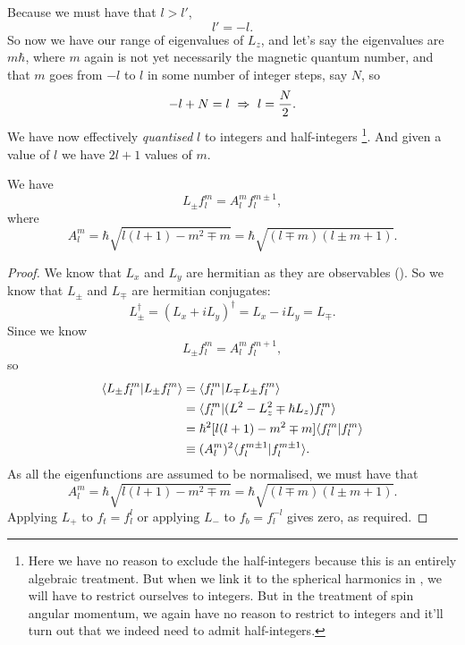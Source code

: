 Because we must have that $l>l'$, 
\begin{equation}
l'=-l.
\end{equation}
So now we have our range of eigenvalues of $L_z$, and let's say the eigenvalues are $m\hbar$, 
where $m$ again is not yet necessarily the magnetic quantum number, and that
$m$ goes from $-l$ to $l$ in some number of integer steps, say $N$, so
\begin{equation}
-l+N=l\ \Rightarrow\ l=\frac{N}{2}.
\end{equation}
We have now effectively \textit{quantised} $l$ to integers and half-integers
\footnote{Here we have no reason to exclude the half-integers because this is 
an entirely algebraic treatment. But when we link it to the spherical harmonics 
in , we will have to restrict ourselves to integers. 
But in the treatment of spin angular momentum, we again have no reason to 
restrict to integers and it'll turn out that we 
indeed need to admit half-integers.}. 
And given a value of $l$ we have $2l+1$ values of $m$. 
\begin{prt}
\label{propangmomlad}
We have 
\begin{equation}
L_{\pm}f^m_l=A^m_lf^{m\pm1}_l,
\end{equation}
where
\begin{equation}
A^m_l=\hbar\sqrt{l(l+1)-m^2\mp m}=\hbar\sqrt{(l\mp m)(l\pm m+1)}.
\end{equation}
\end{prt}
\begin{proof}
We know that $L_x$ and $L_y$ are hermitian as they are observables (). So we know that $L_{\pm}$ and $L_{\mp}$ are hermitian conjugates:
\begin{equation}
L_{\pm}^{\dagger}=(L_x+iL_y)^{\dagger}=L_x-iL_y=L_{\mp}.
\end{equation}
Since we know 
\begin{equation}
L_{\pm}f^m_l=A^{m}_lf^{m+1}_l, 
\end{equation}
so
\begin{equation}
\begin{aligned}
\langle L_{\pm}f^m_l|L_{\pm}f^m_l\rangle&=\langle f^m_l|L_{\mp}L_{\pm}f^m_l\rangle\\
&=\langle f^m_l|(L^2-L^2_z\mp\hbar L_z )f^m_l\rangle\\
&=\hbar^2[l(l+1)-m^2\mp m]\langle f^m_l|f^m_l\rangle\\
&\equiv(A^{m}_l)^2\langle f^{m\pm1}_l|f^{m\pm1}_l\rangle.
\end{aligned}
\end{equation}
As all the eigenfunctions are assumed to be normalised, we must have that
\begin{equation}
A^m_l=\hbar\sqrt{l(l+1)-m^2\mp m}=\hbar\sqrt{(l\mp m)(l\pm m+1)}.
\end{equation}
Applying $L_+$ to $f_t=f^l_l$ or applying $L_-$ to $f_b=f^{-l}_l$ gives zero, 
as required. 
\end{proof}

